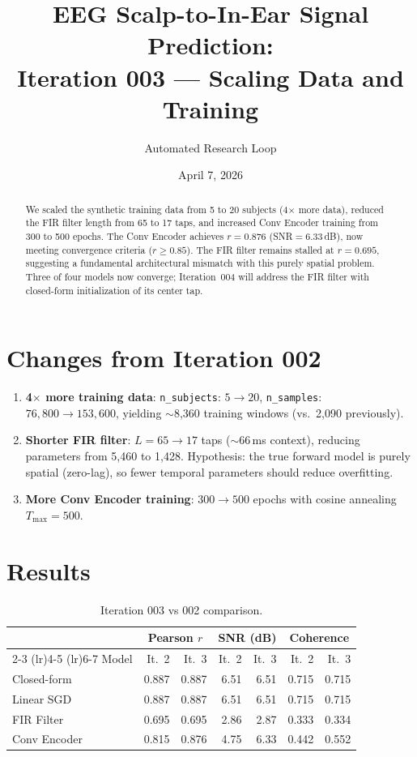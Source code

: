 \documentclass[11pt,a4paper]{article}
\title{EEG Scalp-to-In-Ear Signal Prediction:\\
  Iteration 003 --- Scaling Data and Training}
\author{Automated Research Loop}
\date{April 7, 2026}
\begin{document}
\maketitle

\begin{abstract}
We scaled the synthetic training data from 5 to 20 subjects (4$\times$ more data),
reduced the FIR filter length from 65 to 17 taps, and increased Conv Encoder
training from 300 to 500 epochs. The Conv Encoder achieves $r=0.876$
(SNR$=6.33$\,dB), now meeting convergence criteria ($r \geq 0.85$). The FIR
filter remains stalled at $r=0.695$, suggesting a fundamental architectural
mismatch with this purely spatial problem. Three of four models now converge;
Iteration~004 will address the FIR filter with closed-form initialization of
its center tap.
\end{abstract}

\section{Changes from Iteration 002}

\begin{enumerate}
  \item \textbf{4$\times$ more training data}: \texttt{n\_subjects}: $5 \to 20$,
    \texttt{n\_samples}: $76{,}800 \to 153{,}600$, yielding $\sim$8,360 training
    windows (vs.\ 2,090 previously).
  \item \textbf{Shorter FIR filter}: $L = 65 \to 17$ taps ($\sim$66\,ms context),
    reducing parameters from 5,460 to 1,428. Hypothesis: the true forward model
    is purely spatial (zero-lag), so fewer temporal parameters should reduce
    overfitting.
  \item \textbf{More Conv Encoder training}: $300 \to 500$ epochs with cosine
    annealing $T_{\max} = 500$.
\end{enumerate}

\section{Results}

\begin{table}[H]
\centering
\caption{Iteration 003 vs 002 comparison.}
\begin{tabular}{lrrrrrr}
\toprule
& \multicolumn{2}{c}{Pearson $r$} & \multicolumn{2}{c}{SNR (dB)} & \multicolumn{2}{c}{Coherence} \\
\cmidrule(lr){2-3} \cmidrule(lr){4-5} \cmidrule(lr){6-7}
Model & It.~2 & It.~3 & It.~2 & It.~3 & It.~2 & It.~3 \\
\midrule
Closed-form & 0.887 & 0.887 & 6.51 & 6.51 & 0.715 & 0.715 \\
Linear SGD & 0.887 & 0.887 & 6.51 & 6.51 & 0.715 & 0.715 \\
FIR Filter & 0.695 & 0.695 & 2.86 & 2.87 & 0.333 & 0.334 \\
Conv Encoder & 0.815 & \textcolor{good}{0.876} & 4.75 & \textcolor{good}{6.33} & 0.442 & \textcolor{good}{0.552} \\
\bottomrule
\end{tabular}
\end{table}
\end{document}
